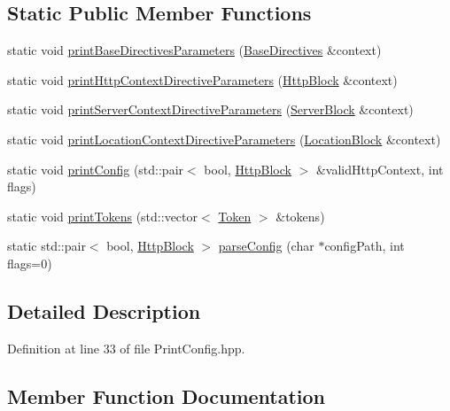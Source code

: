 \subsection*{Static Public Member Functions}
\begin{DoxyCompactItemize}
\item 
static void \hyperlink{classft_1_1_print_config_ad71821d54e46c04a81d26dbabd3c4b20}{print\+Base\+Directives\+Parameters} (\hyperlink{classft_1_1_base_directives}{Base\+Directives} \&context)
\item 
static void \hyperlink{classft_1_1_print_config_af912dc88061594effceb350034b7c5d9}{print\+Http\+Context\+Directive\+Parameters} (\hyperlink{classft_1_1_http_block}{Http\+Block} \&context)
\item 
static void \hyperlink{classft_1_1_print_config_a5f88f0aae9e0678e2637ae329b74739e}{print\+Server\+Context\+Directive\+Parameters} (\hyperlink{classft_1_1_server_block}{Server\+Block} \&context)
\item 
static void \hyperlink{classft_1_1_print_config_a8862bb68558be4a7286c6ce05db3fa4d}{print\+Location\+Context\+Directive\+Parameters} (\hyperlink{classft_1_1_location_block}{Location\+Block} \&context)
\item 
static void \hyperlink{classft_1_1_print_config_a09fbf488251ed5f5079e798b1ce04caf}{print\+Config} (std\+::pair$<$ bool, \hyperlink{classft_1_1_http_block}{Http\+Block} $>$ \&valid\+Http\+Context, int flags)
\item 
static void \hyperlink{classft_1_1_print_config_aecc55315a253587bb0a987bd086ca39b}{print\+Tokens} (std\+::vector$<$ \hyperlink{classft_1_1_token}{Token} $>$ \&tokens)
\item 
static std\+::pair$<$ bool, \hyperlink{classft_1_1_http_block}{Http\+Block} $>$ \hyperlink{classft_1_1_print_config_afb9aa52211052c2ac541dd130558da0a}{parse\+Config} (char $\ast$config\+Path, int flags=0)
\end{DoxyCompactItemize}


\subsection{Detailed Description}


Definition at line 33 of file Print\+Config.\+hpp.



\subsection{Member Function Documentation}
\mbox{\label{classft_1_1_print_config_afb9aa52211052c2ac541dd130558da0a}} 
